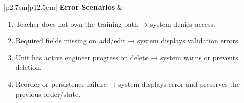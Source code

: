 \begin{table}[H]
\begin{tabular}{|p{2.7cm}|p{12.5cm}|}
        \hline
        \textbf{Error Scenarios} &
        \begin{minipage}[t]{\linewidth}
            \begin{enumerate}[topsep=0pt,itemsep=1pt,parsep=0pt,partopsep=0pt]
                \item Teacher does not own the training path → system denies access.
                \item Required fields missing on add/edit → system displays validation errors.
                \item Unit has active engineer progress on delete → system warns or prevents deletion.
                \item Reorder or persistence failure → system displays error and preserves the previous order/state.
            \end{enumerate}
        \end{minipage} \\
        \hline
    \end{tabular}
    \label{tab:teacher-manage-units}
\end{table}
 
